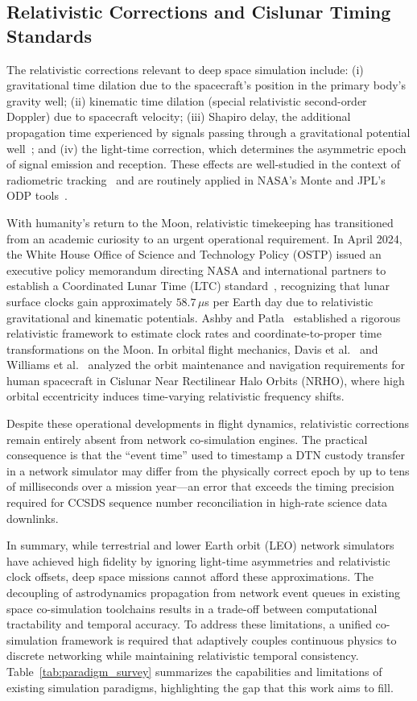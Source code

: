 \documentclass[a4paper,fleqn]{cas-sc}
\begin{document}
\subsection{Relativistic Corrections and Cislunar Timing Standards}
The relativistic corrections relevant to deep space simulation include: (i) gravitational time dilation due to the spacecraft's position in the primary body's gravity well; (ii) kinematic time dilation (special relativistic second-order Doppler) due to spacecraft velocity; (iii) Shapiro delay, the additional propagation time experienced by signals passing through a gravitational potential well~\cite{shapiro}; and (iv) the light-time correction, which determines the asymmetric epoch of signal emission and reception. These effects are well-studied in the context of radiometric tracking~\cite{moyer_formulation} and are routinely applied in NASA's Monte and JPL's ODP tools~\cite{monte}. 

{\color{revcolor}With humanity's return to the Moon, relativistic timekeeping has transitioned from an academic curiosity to an urgent operational requirement. In April 2024, the White House Office of Science and Technology Policy (OSTP) issued an executive policy memorandum directing NASA and international partners to establish a Coordinated Lunar Time (LTC) standard~\cite{ostp_cislunar_time_2024}, recognizing that lunar surface clocks gain approximately $58.7\,\mu$s per Earth day due to relativistic gravitational and kinematic potentials. Ashby and Patla~\cite{ashby_cislunar_clock_2024} established a rigorous relativistic framework to estimate clock rates and coordinate-to-proper time transformations on the Moon. In orbital flight mechanics, Davis et al.~\cite{davis_nrho_nav_2017} and Williams et al.~\cite{williams_nrho} analyzed the orbit maintenance and navigation requirements for human spacecraft in Cislunar Near Rectilinear Halo Orbits (NRHO), where high orbital eccentricity induces time-varying relativistic frequency shifts.} 

Despite these operational developments in flight dynamics, relativistic corrections remain entirely absent from network co-simulation engines. The practical consequence is that the ``event time'' used to timestamp a DTN custody transfer in a network simulator may differ from the physically correct epoch by up to tens of milliseconds over a mission year---an error that exceeds the timing precision required for CCSDS sequence number reconciliation in high-rate science data downlinks.

In summary, while terrestrial and lower Earth orbit (LEO) network simulators have achieved high fidelity by ignoring light-time asymmetries and relativistic clock offsets, deep space missions cannot afford these approximations. The decoupling of astrodynamics propagation from network event queues in existing space co-simulation toolchains results in a trade-off between computational tractability and temporal accuracy. To address these limitations, a unified co-simulation framework is required that adaptively couples continuous physics to discrete networking while maintaining relativistic temporal consistency. Table~\ref{tab:paradigm_survey} summarizes the capabilities and limitations of existing simulation paradigms, highlighting the gap that this work aims to fill.
\end{document}
